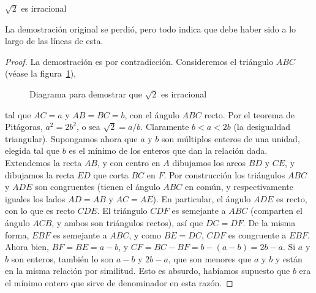   \begin{theorem}
    \label{theo:sqrt2-irracional}
    \(\sqrt{2}\) es irracional
  \end{theorem}
  La demostración original se perdió,
  pero todo indica
  que debe haber sido a lo largo de las líneas de esta.
  \begin{proof}
    La demostración es por contradicción.%
    Consideremos el triángulo \(A B C\)
    (véase la figura~\ref{fig:sqrt2}),
    \begin{figure}[htbp]
      \centering
      \caption{Diagrama para demostrar que $\sqrt{2}$ es irracional}
      \label{fig:sqrt2}
    \end{figure}
    tal que \(A C = a\) y \(A B = B C = b\),
    con el ángulo \(A B C\) recto.
    Por el teorema de Pitágoras,
    \(a^2 = 2 b^2\),
    o sea \(\sqrt{2} = a / b\).
    Claramente \(b < a < 2 b\)
    (la desigualdad triangular).%
    Supongamos ahora que \(a\) y \(b\) son múltiplos enteros
    de una unidad,
    elegida tal que \(b\)
    es el mínimo de los enteros que dan la relación dada.
    Extendemos la recta \(A B\),
    y con centro en \(A\) dibujamos los arcos \(B D\) y \(C E\),
    y dibujamos la recta \(E D\) que corta \(B C\) en \(F\).
    Por construcción
    los triángulos \(A B C\) y \(A D E\) son congruentes
    (tienen el ángulo \(A B C\) en común,
     y respectivamente iguales
     los lados \(A D = A B\) y \(A C = A E\)).
    En particular,
    el ángulo \(A D E\) es recto,
    con lo que es recto \(C D E\).
    El triángulo \(C D F\) es semejante a \(A B C\)%
    (comparten el ángulo \(A C B\),
     y ambos son triángulos rectos),
    así que \(D C = D F\).
    De la misma forma,
    \(E B F\) es semejante a \(A B C\),
    y como \(B E = D C\),
    \(C D F\) es congruente a \(E B F\).%
    Ahora bien,
    \(B F = B E = a - b\),
    y \(C F = B C - B F = b - (a - b) = 2 b - a\).
    Si \(a\) y \(b\) son enteros,
    también lo son \(a - b\) y \(2 b - a\),
    que son menores que \(a\) y \(b\)
    y están en la misma relación por similitud.
    Esto es absurdo,
    habíamos supuesto que \(b\) era el mínimo entero
    que sirve de denominador en esta razón.
  \end{proof}

